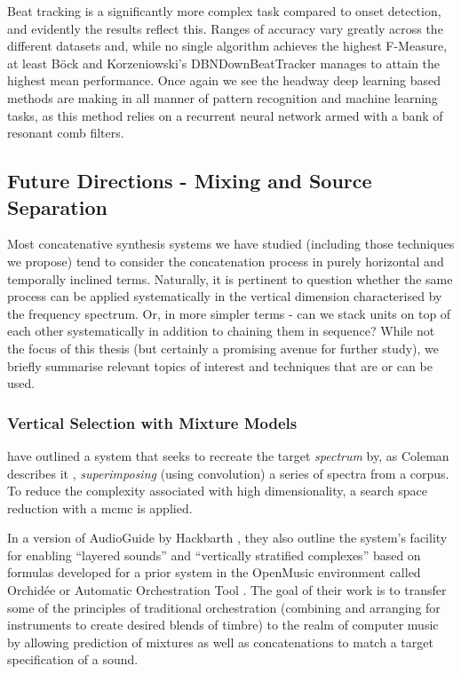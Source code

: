 {{Beat tracking is a significantly more complex task compared to onset detection, and evidently the results reflect this. Ranges of accuracy vary greatly across the different datasets and, while no single algorithm achieves the highest F-Measure, at least Böck and Korzeniowski’s DBNDownBeatTracker manages to attain the highest mean performance. Once again we see the headway deep learning based methods are making in all manner of pattern recognition and machine learning tasks, as this method relies on a recurrent neural network armed with a bank of resonant comb filters. 

\subsection{Future Directions - Mixing and Source Separation}

Most concatenative synthesis systems we have studied (including those techniques we propose) tend to consider the concatenation process in purely horizontal and temporally inclined terms.  Naturally, it is pertinent to question whether the same process can be applied systematically in the vertical dimension characterised by the frequency spectrum. Or, in more simpler terms - can we stack units on top of each other systematically in addition to chaining them in sequence? While not the focus of this thesis (but certainly a promising avenue for further study), we briefly summarise relevant topics of interest and  techniques that are or can be used.

\subsubsection{Vertical Selection with Mixture Models}

\cite{Hoffman2009} have outlined a system that seeks to recreate the target \textit{spectrum} by, as Coleman describes it \citeyearpar{Coleman2010}, \textit{superimposing} (using convolution) a series of spectra from a corpus. To reduce the complexity associated with high dimensionality, a search space reduction with a \acrfull{mcmc} is applied. 

In a version of AudioGuide by Hackbarth \citep{Hackbarth2013}, they also outline the system's facility for enabling ``layered sounds'' and ``vertically stratified complexes'' based on formulas \citep{Tardieu2008}  developed for a prior system in the OpenMusic environment called Orchidée or Automatic Orchestration Tool \citep{Carpentier2010}. The goal of their work is to transfer some of the principles of traditional orchestration (combining and arranging for instruments to create desired blends of timbre) to the realm of computer music by allowing prediction of mixtures as well as concatenations to match a target specification of a sound.

}}
